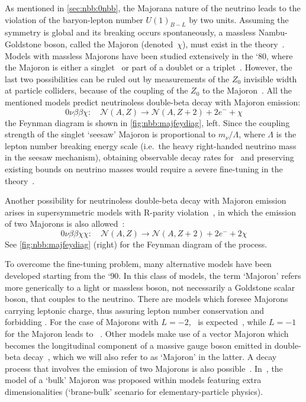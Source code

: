 As mentioned in \cref{sec:nbb:0nbb}, the Majorana nature of the neutrino leads
to the violation of the baryon-lepton number $U(1)_{B-L}$ by two units.
Assuming the symmetry is global and its breaking occurs spontaneously, a
massless Nambu-Goldstone boson, called the Majoron (denoted~$\chi$), must exist
in the theory~\cite{Chikashige1981, Schechter1982, Gelmini1981, Georgi1981,
Mohpatra2004}.  Models with massless Majorons have been studied extensively in
the `80, where the Majoron is either a singlet~\cite{Chikashige1981} or part of
a doublet or a triplet~\cite{Gelmini1981, Georgi1981}. However, the last two
possibilities can be ruled out by measurements of the $Z_0$ invisible width at
particle colliders, because of the coupling of the $Z_0$ to the
Majoron~\cite{Berezhiani1992}. All the mentioned models predict neutrinoless
double-beta decay with Majoron emission:
\[
  0\nu\beta\beta\chi:\quad
    \mathcal{N}(A,Z) \longrightarrow \mathcal{N}(A,Z+2) + 2e^- + \chi
\]
the Feynman diagram is shown in \cref{fig:nbb:majfeydiag}, left. Since the
coupling strength of the singlet `seesaw' Majoron is proportional to $m_\nu /
\Lambda$, where $\Lambda$ is the lepton number breaking energy scale (i.e.~the
heavy right-handed neutrino mass in the seesaw mechanism), obtaining observable
decay rates for \onbbx\ and preserving existing bounds on neutrino masses would
require a severe fine-tuning in the theory~\cite{Burgess1993, Burgess1994}.

Another possibility for neutrinoless double-beta decay with Majoron emission
arises in supersymmetric models with R-parity violation~\cite{Masiero1990,
Mohpatra2004}, in which the emission of two Majorons is also
allowed~\cite{Mohpatra1988}:
\[
  0\nu\beta\beta\chi\chi:\quad
    \mathcal{N}(A,Z) \longrightarrow \mathcal{N}(A,Z+2) + 2e^- + 2\chi
\]
See \cref{fig:nbb:majfeydiag} (right) for the Feynman diagram of the process.

To overcome the fine-tuning problem, many alternative models have been
developed starting from the `90. In this class of models, the term `Majoron'
refers more generically to a light or massless boson, not necessarily a
Goldstone scalar boson, that couples to the neutrino. There are models which
foresee Majorons carrying leptonic charge, thus assuring lepton number
conservation and forbidding \onbb. For the case of Majorons with $L = −2$,
\onbbx\ is expected~\cite{Burgess1993}, while $L = −1$ for the Majoron leads to
\onbbxx~\cite{Burgess1994}. Other models make use of a vector Majoron which
becomes the longitudinal component of a massive gauge boson emitted in
double-beta decay~\cite{Carone1993}, which we will also refer to as `Majoron'
in the latter. A decay process that involves the emission of two Majorons is
also possible~\cite{Bamert1995}.  In~\cite{Mohpatra2000}, the model of a `bulk'
Majoron was proposed within models featuring extra dimensionalities
(`brane-bulk' scenario for elementary-particle physics).

